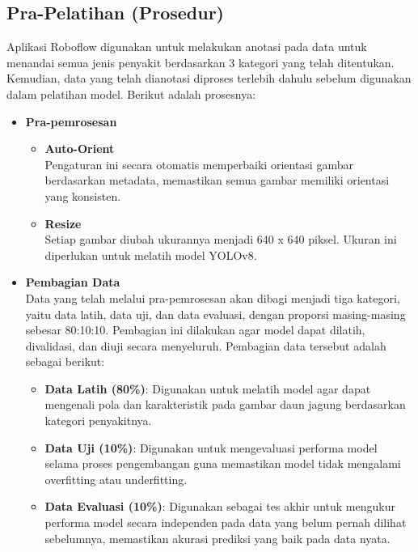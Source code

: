 \documentclass[journal,article,submit,pdftex,moreauthors]{Definitions/mdpi}
\begin{document}
\subsection{Pra-Pelatihan (Prosedur)}
Aplikasi Roboflow digunakan untuk melakukan anotasi pada data untuk menandai semua jenis penyakit berdasarkan 3 kategori yang telah ditentukan. Kemudian, data yang telah dianotasi diproses terlebih dahulu sebelum digunakan dalam pelatihan model. Berikut adalah prosesnya:
\begin{itemize}
    \item \textbf{Pra-pemrosesan} 
    \begin{itemize}
    \item \textbf{Auto-Orient} \\
    Pengaturan ini secara otomatis memperbaiki orientasi gambar berdasarkan metadata, memastikan semua gambar memiliki orientasi yang konsisten.

    \item \textbf{Resize} \\
      Setiap gambar diubah ukurannya menjadi 640 x 640 piksel. Ukuran ini diperlukan untuk melatih model YOLOv8.
    \end{itemize}

     \item \textbf{Pembagian Data} \\
       Data yang telah melalui pra-pemrosesan akan dibagi menjadi tiga kategori, yaitu data latih, data uji, dan data evaluasi, dengan proporsi masing-masing sebesar 80:10:10. Pembagian ini dilakukan agar model dapat dilatih, divalidasi, dan diuji secara menyeluruh. Pembagian data tersebut adalah sebagai berikut:

        \begin{itemize}
            \item \textbf{Data Latih (80\%)}: Digunakan untuk melatih model agar dapat mengenali pola dan karakteristik pada gambar daun jagung berdasarkan kategori penyakitnya.
            \item \textbf{Data Uji (10\%)}: Digunakan untuk mengevaluasi performa model selama proses pengembangan guna memastikan model tidak mengalami overfitting atau underfitting.
            \item \textbf{Data Evaluasi (10\%)}: Digunakan sebagai tes akhir untuk mengukur performa model secara independen pada data yang belum pernah dilihat sebelumnya, memastikan akurasi prediksi yang baik pada data nyata.
        \end{itemize}
    

\end{itemize}
\end{document}
